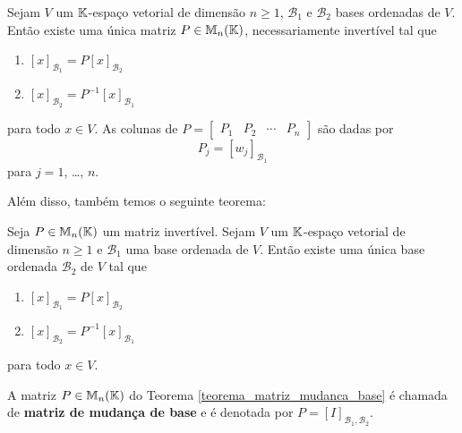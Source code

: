\begin{teorema}\label{teorema_mudanca_base}
  Sejam $V$ um $\mathbb{K}$-espaço vetorial de dimensão $n \ge 1$, $\mathcal{B}_1$ e $\mathcal{B}_2$ bases ordenadas de $V$. Então existe uma única matriz $P \in \mathbb{M}_n(\mathbb{K})$, necessariamente invertível tal que
  \begin{enumerate}[label={\roman*})]
    \item $[x]_{\mathcal{B}_1} = P[x]_{\mathcal{B}_2}$
    \item $[x]_{\mathcal{B}_2} = P^{-1}[x]_{\mathcal{B}_1}$
  \end{enumerate}
  para todo $x \in V$. As colunas de $P = \begin{bmatrix}
    P_1 & P_2 & \cdots & P_n
  \end{bmatrix}$ são dadas por
  \[
    P_j = [w_j]_{\mathcal{B}_1}
  \]
  para $j = 1$, \dots, $n$.
\end{teorema}

Além disso, também temos o seguinte teorema:

\begin{teorema}\label{teorema_matriz_mudanca_base}
  Seja $P \in \mathbb{M}_n(\mathbb{K})$ um matriz invertível. Sejam $V$ um $\mathbb{K}$-espaço vetorial de dimensão $n \ge 1$ e $\mathcal{B}_1$ uma base ordenada de $V$. Então existe uma única base ordenada $\mathcal{B}_2$ de $V$ tal que
  \begin{enumerate}[label={\roman*})]
    \item $[x]_{\mathcal{B}_1} = P[x]_{\mathcal{B}_2}$
    \item $[x]_{\mathcal{B}_2} = P^{-1}[x]_{\mathcal{B}_1}$
  \end{enumerate}
  para todo $x \in V$.
\end{teorema}

\begin{definicao}
  A matriz $P \in \mathbb{M}_n(\mathbb{K})$ do Teorema \ref{teorema_matriz_mudanca_base} é chamada de \textbf{matriz de mudança de base} e é denotada por $P = [I]_{{\mathcal{B}_1},{\mathcal{B}_2}}$.
\end{definicao}

